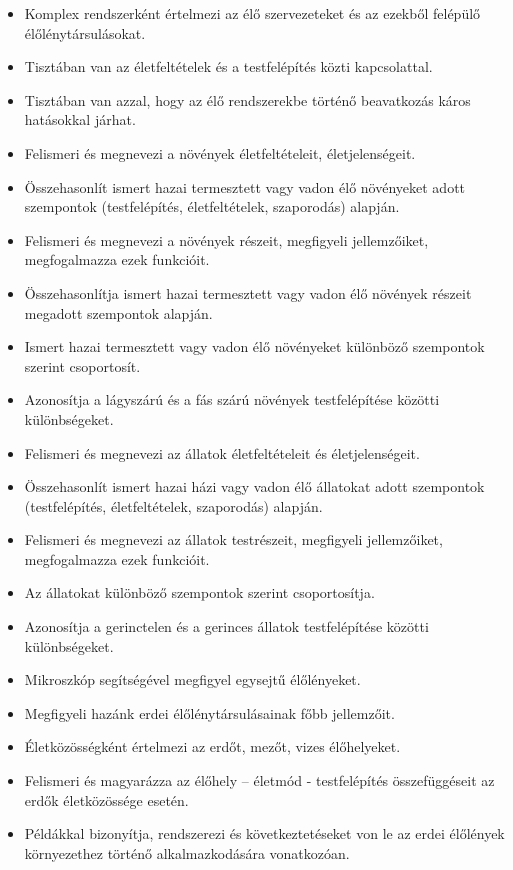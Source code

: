 \begin{itemize}
\item
  Komplex rendszerként értelmezi az élő szervezeteket és az ezekből
  felépülő élőlénytársulásokat.
\item
  Tisztában van az életfeltételek és a testfelépítés közti kapcsolattal.
\item
  Tisztában van azzal, hogy az élő rendszerekbe történő beavatkozás
  káros hatásokkal járhat.
\item
  Felismeri és megnevezi a növények életfeltételeit, életjelenségeit.
\item
  Összehasonlít ismert hazai termesztett vagy vadon élő növényeket adott
  szempontok (testfelépítés, életfeltételek, szaporodás) alapján.
\item
  Felismeri és megnevezi a növények részeit, megfigyeli jellemzőiket,
  megfogalmazza ezek funkcióit.
\item
  Összehasonlítja ismert hazai termesztett vagy vadon élő növények
  részeit megadott szempontok alapján.
\item
  Ismert hazai termesztett vagy vadon élő növényeket különböző
  szempontok szerint csoportosít.
\item
  Azonosítja a lágyszárú és a fás szárú növények testfelépítése közötti
  különbségeket.
\item
  Felismeri és megnevezi az állatok életfeltételeit és életjelenségeit.
\item
  Összehasonlít ismert hazai házi vagy vadon élő állatokat adott
  szempontok (testfelépítés, életfeltételek, szaporodás) alapján.
\item
  Felismeri és megnevezi az állatok testrészeit, megfigyeli
  jellemzőiket, megfogalmazza ezek funkcióit.
\item
  Az állatokat különböző szempontok szerint csoportosítja.
\item
  Azonosítja a gerinctelen és a gerinces állatok testfelépítése közötti
  különbségeket.
\item
  Mikroszkóp segítségével megfigyel egysejtű élőlényeket.
\item
  Megfigyeli hazánk erdei élőlénytársulásainak főbb jellemzőit.
\item
  Életközösségként értelmezi az erdőt, mezőt, vizes élőhelyeket.
\item
  Felismeri és magyarázza az élőhely -- életmód - testfelépítés
  összefüggéseit az erdők életközössége esetén.
\item
  Példákkal bizonyítja, rendszerezi és következtetéseket von le az erdei
  élőlények környezethez történő alkalmazkodására vonatkozóan.

\end{itemize}
